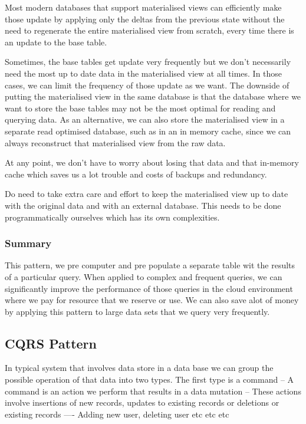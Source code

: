 \documentclass[a4paper, 11pt]{book}
\begin{document}
    Most modern databases that support materialised views can efficiently make those update by applying only the deltas from the previous state without the need to regenerate the entire materialised view from scratch, every time there is an update to the base table.

    Sometimes, the base tables get update very frequently but we don't necessarily need the most up to date data in the materialised view at all times.
    In those cases, we can limit the frequency of those update as we want.
    The downside of putting the materialised view in the same database is that the database where we want to store the base tables may not be the most optimal for reading and querying data.
    As an alternative, we can also store the materialised view in a separate read optimised database, such as in an in memory cache, since we can always reconstruct that materialised view from the raw data.

    At any point, we don't have to worry about losing that data and that in-memory cache which saves us a lot trouble and costs of backups and redundancy.

    Do need to take extra care and effort to keep the materialised view up to date with the original data and with an external database.
    This needs to be done programmatically ourselves which has its own complexities.

    \subsubsection{Summary}
    This pattern, we pre computer and pre populate a separate table wit the results of a particular query.
    When applied to complex and frequent queries, we can significantly improve the performance of those queries in the cloud environment where we pay for resource that we reserve or use.
    We can also save alot of money by applying this pattern to large data sets that we query very frequently.

    \subsection{CQRS Pattern}
    In typical system that involves data store in a data base we can group the possible operation of that data into two types.
    The first type is a command
    -- A command is an action we perform that results in a data mutation
    -- These actions involve insertions of new records, updates to existing records or deletions or existing records
    ---- Adding new user, deleting user etc etc etc
\end{document}
